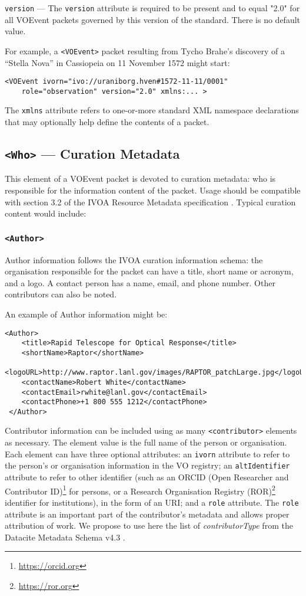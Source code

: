 \documentclass[11pt,a4paper]{ivoa}
\begin{document}
 {\tt version} \label{sec:3.1.3} ---
The {\tt version} attribute is required to be present and to equal "2.0" for
all VOEvent packets governed by this version of the standard. There is no
default value.

For example, a {\tt <VOEvent>} packet resulting from Tycho Brahe's discovery of
a ``Stella Nova'' in Cassiopeia on 11 November 1572 might start:
\begin{lstlisting}
<VOEvent ivorn="ivo://uraniborg.hven#1572-11-11/0001"
    role="observation" version="2.0" xmlns:... >
\end{lstlisting}

The {\tt xmlns} attribute refers to one-or-more standard XML namespace
declarations that may optionally help define the contents of a packet.

\subsection{{\tt <Who>} --- Curation Metadata}
\label{sec:3.2}
This element of a VOEvent packet is devoted to curation metadata: who is
responsible for the information content of the packet. Usage should be
compatible with section 3.2 of the IVOA Resource Metadata specification
\citep{2007ivoa.spec.0302H}. Typical curation content would include:

\subsubsection{\tt <Author>}
Author information follows the IVOA curation information schema: the
organisation responsible for the packet can have a title, short name or acronym,
and a logo. A contact person has a name, email, and phone number. Other
contributors can also be noted.

An example of Author information might be:
\begin{lstlisting}
<Author>
    <title>Rapid Telescope for Optical Response</title>
    <shortName>Raptor</shortName>
    <logoURL>http://www.raptor.lanl.gov/images/RAPTOR_patchLarge.jpg</logoURL>
    <contactName>Robert White</contactName>
    <contactEmail>rwhite@lanl.gov</contactEmail>
    <contactPhone>+1 800 555 1212</contactPhone>
 </Author>
\end{lstlisting}

Contributor information can be included using as many {\tt <contributor>}
elements as necessary. The element value is the full name of the person or
organisation. Each element can have three optional attributes: an {\tt ivorn}
attribute to refer to the person's or organisation information in the VO
registry; an {\tt altIdentifier} attribute to refer to other identifier (such
as an ORCID (Open Researcher and Contributor ID)\footnote{
\url{https://orcid.org}} for persons, or a Research Organisation Registry
(ROR)\footnote{\url{https://ror.org}} identifier for institutions), in the form
of an URI; and a {\tt role} attribute. The {\tt role} attribute is an important
part of the contributor's metadata and allows proper attribution of work. We
propose to use here the list of \emph{contributorType} from the Datacite
Metadata Schema v4.3 \citep{https://doi.org/10.14454/7xq3-zf69}.
\end{document}
